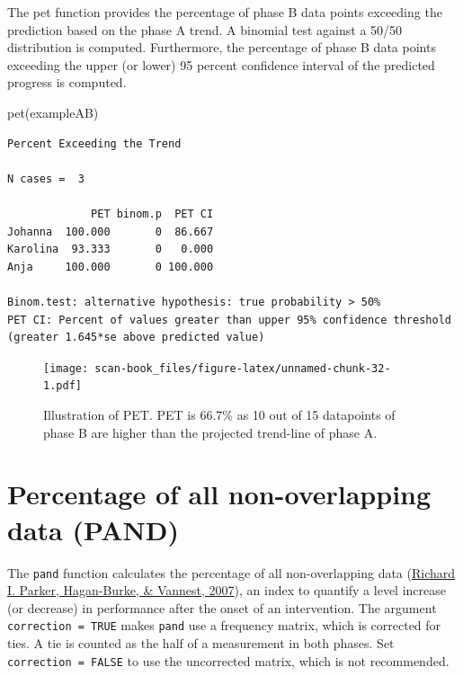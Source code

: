 \documentclass[
]{book}
\newenvironment{Shaded}{\begin{snugshade}}{\end{snugshade}}
\newcommand{\FunctionTok}[1]{\textcolor[rgb]{0.00,0.00,0.00}{#1}}
\newcommand{\NormalTok}[1]{#1}
\begin{document}
The pet function provides the percentage of phase B data points exceeding the prediction based on the phase A trend. A binomial test against a 50/50 distribution is computed. Furthermore, the percentage of phase B data points exceeding the upper (or lower) 95 percent confidence interval of the predicted progress is computed.

\begin{Shaded}
\begin{Highlighting}[]
\FunctionTok{pet}\NormalTok{(exampleAB)}
\end{Highlighting}
\end{Shaded}

\begin{verbatim}
Percent Exceeding the Trend

N cases =  3 

             PET binom.p  PET CI
Johanna  100.000       0  86.667
Karolina  93.333       0   0.000
Anja     100.000       0 100.000

Binom.test: alternative hypothesis: true probability > 50%
PET CI: Percent of values greater than upper 95% confidence threshold (greater 1.645*se above predicted value)
\end{verbatim}

\begin{figure}
\centering
\texttt{[image: scan-book\_files/figure-latex/unnamed-chunk-32-1.pdf]}
\caption{\label{fig:unnamed-chunk-32}Illustration of PET. PET is 66.7\% as 10 out of 15 datapoints of phase B are higher than the projected trend-line of phase A.}
\end{figure}

\hypertarget{percentage-of-all-non-overlapping-data-pand}{%
\section{Percentage of all non-overlapping data (PAND)}\label{percentage-of-all-non-overlapping-data-pand}}

The \texttt{pand} function calculates the percentage of all non-overlapping data (\protect\hyperlink{ref-parker_percentage_2007}{Richard I. Parker, Hagan-Burke, \& Vannest, 2007}), an index to quantify a level increase (or decrease) in performance after the onset of an intervention. The argument \texttt{correction\ =\ TRUE} makes \texttt{pand} use a frequency matrix, which is corrected for ties. A tie is counted as the half of a measurement in both phases. Set \texttt{correction\ =\ FALSE} to use the uncorrected matrix, which is not recommended.
\end{document}
